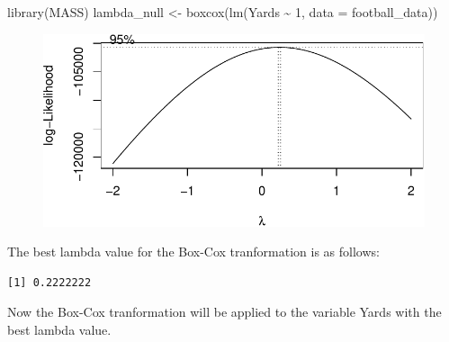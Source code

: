 \documentclass[
  super,
  preprint,
  3p]{elsarticle}
\newenvironment{Shaded}{\begin{snugshade}}{\end{snugshade}}
\newcommand{\AttributeTok}[1]{\textcolor[rgb]{0.40,0.45,0.13}{#1}}
\newcommand{\DecValTok}[1]{\textcolor[rgb]{0.68,0.00,0.00}{#1}}
\newcommand{\FunctionTok}[1]{\textcolor[rgb]{0.28,0.35,0.67}{#1}}
\newcommand{\NormalTok}[1]{\textcolor[rgb]{0.00,0.23,0.31}{#1}}
\newcommand{\OtherTok}[1]{\textcolor[rgb]{0.00,0.23,0.31}{#1}}
\newcommand{\SpecialCharTok}[1]{\textcolor[rgb]{0.37,0.37,0.37}{#1}}
\begin{document}
\begin{Shaded}
\begin{Highlighting}[]
\FunctionTok{library}\NormalTok{(MASS)}
\NormalTok{lambda\_null }\OtherTok{\textless{}{-}} \FunctionTok{boxcox}\NormalTok{(}\FunctionTok{lm}\NormalTok{(Yards }\SpecialCharTok{\textasciitilde{}} \DecValTok{1}\NormalTok{, }\AttributeTok{data =}\NormalTok{ football\_data))}
\end{Highlighting}
\end{Shaded}

\begin{figure}[H]

{\centering \includegraphics{project_report_files/figure-pdf/unnamed-chunk-22-1.pdf}

}

\end{figure}

The best lambda value for the Box-Cox tranformation is as follows:

\begin{Shaded}
\end{Shaded}

\begin{verbatim}
[1] 0.2222222
\end{verbatim}

Now the Box-Cox tranformation will be applied to the variable Yards with
the best lambda value.

\begin{Shaded}
\end{Shaded}
\end{document}
